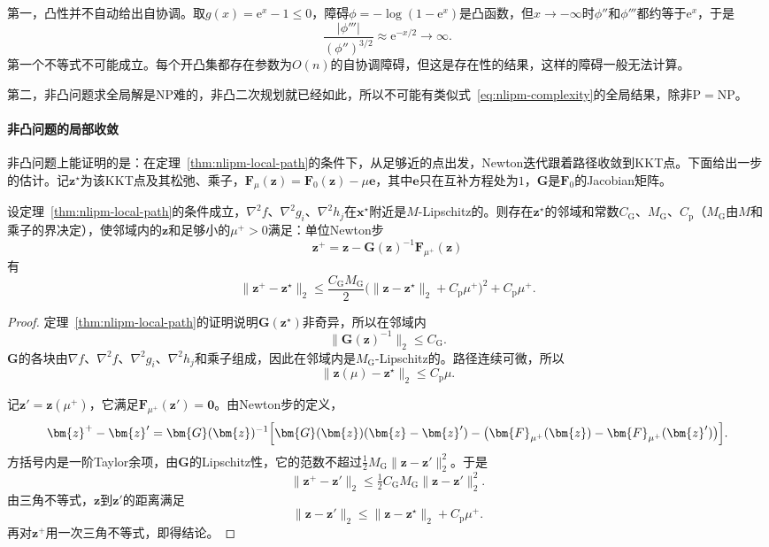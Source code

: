 第一，凸性并不自动给出自协调。取$g(x)=\mathrm{e}^x-1\leq0$，障碍$\phi=-\log(1-\mathrm{e}^x)$是凸函数，但$x\to-\infty$时$\phi''$和$\phi'''$都约等于$\mathrm{e}^x$，于是
\[
 \frac{\lvert\phi'''\rvert}{(\phi'')^{3/2}}\approx\mathrm{e}^{-x/2}\to\infty.
\]
第一个不等式不可能成立。每个开凸集都存在参数为$O(n)$的自协调障碍，但这是存在性的结果，这样的障碍一般无法计算。

第二，非凸问题求全局解是NP难的，非凸二次规划就已经如此，所以不可能有类似式~\eqref{eq:nlipm-complexity}的全局结果，除非$\mathrm{P}=\mathrm{NP}$。

\paragraph{非凸问题的局部收敛}
非凸问题上能证明的是：在定理~\ref{thm:nlipm-local-path}的条件下，从足够近的点出发，Newton迭代跟着路径收敛到KKT点。下面给出一步的估计。记$\bm{z}^\star$为该KKT点及其松弛、乘子，$\bm{F}_\mu(\bm{z})=\bm{F}_0(\bm{z})-\mu\bm{e}$，其中$\bm{e}$只在互补方程处为$1$，$\bm{G}$是$\bm{F}_0$的Jacobian矩阵。

\begin{theorem}[Newton步的局部估计]
\label{thm:nlipm-local-rate}
设定理~\ref{thm:nlipm-local-path}的条件成立，$\nabla^2f$、$\nabla^2g_i$、$\nabla^2h_j$在$\bm{x}^\star$附近是$M$-Lipschitz的。则存在$\bm{z}^\star$的邻域和常数$C_{\mathrm{G}}$、$M_{\mathrm{G}}$、$C_{\mathrm{p}}$（$M_{\mathrm{G}}$由$M$和乘子的界决定），使邻域内的$\bm{z}$和足够小的$\mu^+>0$满足：单位Newton步
\begin{equation}
 \bm{z}^+=\bm{z}-\bm{G}(\bm{z})^{-1}\bm{F}_{\mu^+}(\bm{z})
 \label{eq:nlipm-local-step}
\end{equation}
有
\begin{equation}
 \lVert\bm{z}^+-\bm{z}^\star\rVert_2\leq\frac{C_{\mathrm{G}}M_{\mathrm{G}}}{2}\bigl(\lVert\bm{z}-\bm{z}^\star\rVert_2+C_{\mathrm{p}}\mu^+\bigr)^2+C_{\mathrm{p}}\mu^+.
 \label{eq:nlipm-local-rate}
\end{equation}
\end{theorem}

\begin{proof}
定理~\ref{thm:nlipm-local-path}的证明说明$\bm{G}(\bm{z}^\star)$非奇异，所以在邻域内
\[
 \lVert\bm{G}(\bm{z})^{-1}\rVert_2\leq C_{\mathrm{G}}.
\]
$\bm{G}$的各块由$\nabla f$、$\nabla^2f$、$\nabla^2g_i$、$\nabla^2h_j$和乘子组成，因此在邻域内是$M_{\mathrm{G}}$-Lipschitz的。路径连续可微，所以
\[
 \lVert\bm{z}(\mu)-\bm{z}^\star\rVert_2\leq C_{\mathrm{p}}\mu.
\]

记$\bm{z}'=\bm{z}(\mu^+)$，它满足$\bm{F}_{\mu^+}(\bm{z}')=\bm{0}$。由Newton步的定义，
\[
 \bm{z}^+-\bm{z}'=\bm{G}(\bm{z})^{-1}\Bigl[\bm{G}(\bm{z})(\bm{z}-\bm{z}')-\bigl(\bm{F}_{\mu^+}(\bm{z})-\bm{F}_{\mu^+}(\bm{z}')\bigr)\Bigr].
\]
方括号内是一阶Taylor余项，由$\bm{G}$的Lipschitz性，它的范数不超过$\tfrac12M_{\mathrm{G}}\lVert\bm{z}-\bm{z}'\rVert_2^2$。于是
\[
 \lVert\bm{z}^+-\bm{z}'\rVert_2\leq\tfrac12C_{\mathrm{G}}M_{\mathrm{G}}\lVert\bm{z}-\bm{z}'\rVert_2^2.
\]
由三角不等式，$\bm{z}$到$\bm{z}'$的距离满足
\[
 \lVert\bm{z}-\bm{z}'\rVert_2\leq\lVert\bm{z}-\bm{z}^\star\rVert_2+C_{\mathrm{p}}\mu^+.
\]
再对$\bm{z}^+$用一次三角不等式，即得结论。
\end{proof}

